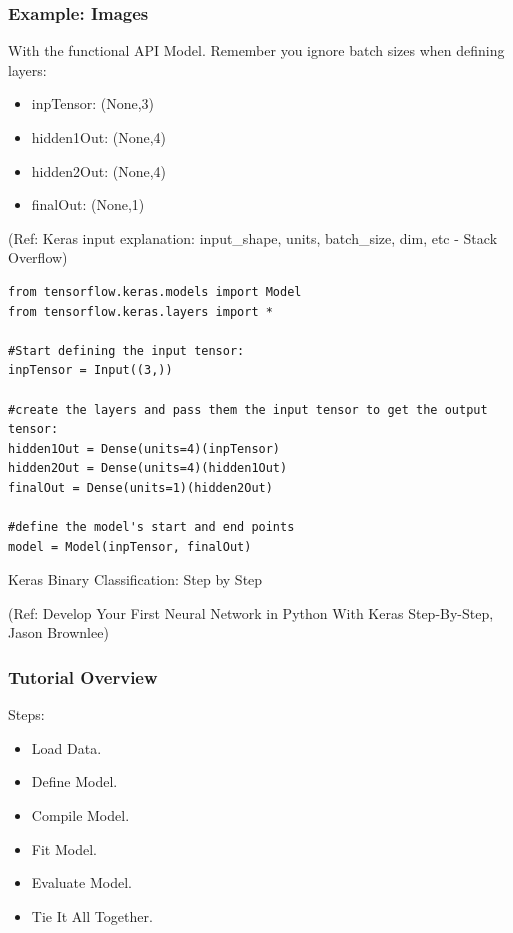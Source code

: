 \begin{frame}[fragile] \frametitle{Example: Images}

With the functional API Model. Remember you ignore batch sizes when defining layers:

\begin{itemize}
\item  inpTensor: (None,3)
\item  hidden1Out: (None,4)
\item  hidden2Out: (None,4)
\item  finalOut: (None,1)
\end{itemize}

\tiny{(Ref: Keras input explanation: input\_shape, units, batch\_size, dim, etc - Stack Overflow)}
\begin{lstlisting}
from tensorflow.keras.models import Model
from tensorflow.keras.layers import *

#Start defining the input tensor:
inpTensor = Input((3,))

#create the layers and pass them the input tensor to get the output tensor:
hidden1Out = Dense(units=4)(inpTensor)
hidden2Out = Dense(units=4)(hidden1Out)
finalOut = Dense(units=1)(hidden2Out)

#define the model's start and end points
model = Model(inpTensor, finalOut)
\end{lstlisting}
\end{frame}


\begin{frame}
  \begin{center}
    {\Large Keras Binary Classification: Step by Step}
    
    \tiny{(Ref:  Develop Your First Neural Network in Python With Keras Step-By-Step, Jason Brownlee)}
  \end{center}
\end{frame}

\begin{frame}[fragile] \frametitle{Tutorial Overview}
Steps:
\begin{itemize}
\item  Load Data.
\item  Define Model.
\item  Compile Model.
\item  Fit Model.
\item  Evaluate Model.
\item  Tie It All Together.

\end{itemize}
\end{frame}


